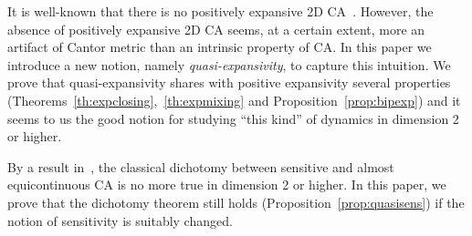 \documentclass{llncs}
\newcommand{\ignore}[1]{}
\begin{document}
It is well-known that there is no positively expansive 2D CA~\cite{shereshevsky93}.\ignore{
 This result can be restated in terms of defects propagation. Indeed, in dimension 1, given a pair of distinct configurations , call defects differences between  and .
Any expansive CA create and propagates defects in both directions (left and right) at each time step. In this way, at some later time ,  and  will differ in a cell near the
origin (how much near is determined by the expansivity constant).
The same behavior is not possible in dimension 2. The point is that
for any precision , the exists a pair of configurations 
for which defects propagate in the 2D space avoiding the 
square  centered in the origin ( is such that
 is the least integer such that ).
However, computer experiments show that there are many 2D CA which are able to create new defects and propagate them at each 
time step although this phenomenon is not enough to provide expansive behavior. In some sense these CA ``seem'' expansive and the fact that they are not appears to be more an artifact of the Cantor metric than an intrinsic property of the automaton.}
However, the absence of positively expansive 2D CA seems, at a certain extent,
more an artifact of Cantor metric than an intrinsic property of CA.
In this paper we introduce a new notion, namely \emph{quasi-expansivity}, to capture this intuition. We prove that quasi-expansivity shares with positive expansivity several properties (Theorems~\ref{th:expclosing},~\ref{th:expmixing} and Proposition~\ref{prop:bipexp}) and it seems to us the good notion for studying ``this kind'' of dynamics in dimension 2 or higher. 

By a result in~\cite{theyssier08}, the classical dichotomy between sensitive and almost equicontinuous CA is no more true in dimension 2 or higher. In this paper, we prove that the dichotomy theorem still holds (Proposition~\ref{prop:quasisens}) if
the notion of sensitivity is suitably changed. 
\end{document}
